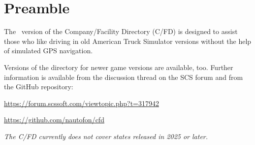 \maketitle

\vspace{5mm}
\section*{Preamble}

{
\justifying

The \OldVersionNumber\ version of the Company/Facility Directory (C/FD) is designed to assist those who like driving in old American Truck Simulator versions without the help of simulated GPS navigation.

Versions of the directory for newer game versions are available, too.
Further information is available from the discussion thread on the SCS forum and from the GitHub repository:

\centering \vspace{1ex}
\url{https://forum.scssoft.com/viewtopic.php?t=317942} \par
\centering \vspace{1ex}
\url{https://github.com/nautofon/cfd} \par
}

\copyrightblock
\thispagestyle{empty}

\tableofcontents
\thispagestyle{empty}

\vspace{1.5em} \noindent
\textsl{The C/FD currently does not cover states released in 2025 or later.}
